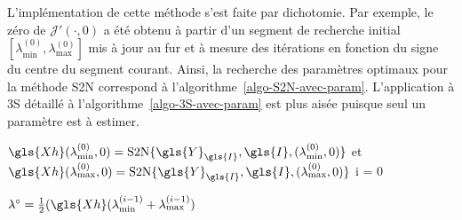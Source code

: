 L'implémentation de cette méthode s'est faite par dichotomie. Par exemple, le zéro de $\mathcal{J}'\left(\cdot,0\right)$ a été obtenu à partir d'un segment de recherche initial $[\lambda_{\mathrm{min}}^{(0)}, \lambda_{\mathrm{max}}^{(0)}]$ mis à jour au fur et à mesure des itérations en fonction du signe du centre du segment courant. Ainsi, la recherche des paramètres optimaux pour la méthode S2N correspond à l'algorithme~\ref{algo-S2N-avec-param}. L'application à 3S détaillé à l'algorithme~\ref{algo-3S-avec-param} est plus aisée puisque seul un paramètre est à estimer.





    \begin{normalalgorithme*}
        \begin{minipage}{\textwidth}
            \begin{algorithm}[H]
                
                \medskip

                $\gls{Xh}(\lambda_{\mathrm{min}}^{(0)}, 0) = \mathrm{S2N}\{\gls{Y}_{\gls{I}}, \gls{I}, (\lambda_{\mathrm{min}}^{(0)}, 0)\}$ et 
                $\gls{Xh}(\lambda_{\mathrm{max}}^{(0)}, 0) = \mathrm{S2N}\{\gls{Y}_{\gls{I}}, \gls{I}, (\lambda_{\mathrm{max}}^{(0)}, 0)\}$\;
                i = 0\;

                \medskip
                $\lambda^{\circ} = \frac{1}{2}(\gls{Xh}(\lambda_{\mathrm{min}}^{(i-1)} + \lambda_{\mathrm{max}}^{(i-1)})$


\end{algorithm}
\end{minipage}
\end{normalalgorithme*}
